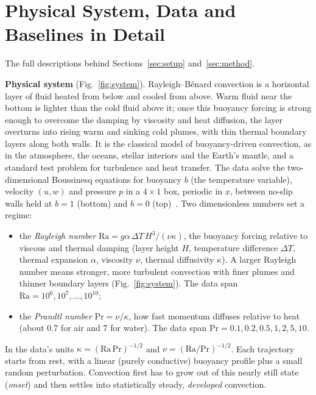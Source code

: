 \documentclass[11pt]{article}
\begin{document}
\FloatBarrier
\section{Physical System, Data and Baselines in Detail}
\label{app:setup}

The full descriptions behind Sections~\ref{sec:setup} and~\ref{sec:method}.

\textbf{Physical system} (Fig.~\ref{fig:system}). Rayleigh--B\'enard convection is a horizontal layer of fluid
heated from below and cooled from above. Warm fluid near the bottom is lighter than the cold fluid above it; once
this buoyancy forcing is strong enough to overcome the damping by viscosity and heat diffusion, the layer overturns
into rising warm and sinking cold plumes, with thin thermal boundary layers along both walls. It is the classical
model of buoyancy-driven convection, as in the atmosphere, the oceans, stellar interiors and the Earth's mantle,
and a standard test problem for turbulence and heat transfer. The data solve the two-dimensional Boussinesq
equations for buoyancy $b$ (the temperature variable), velocity $(u, w)$ and pressure $p$ in a $4\times1$ box,
periodic in $x$, between no-slip walls held at $b=1$ (bottom) and $b=0$ (top)~\cite{wellrb}. Two dimensionless
numbers set a regime:
\begin{itemize}
    \item the \emph{Rayleigh number} $\mathrm{Ra}=g\alpha\,\Delta T\,H^3/(\nu\kappa)$, the buoyancy forcing
    relative to viscous and thermal damping (layer height $H$, temperature difference $\Delta T$, thermal
    expansion $\alpha$, viscosity $\nu$, thermal diffusivity $\kappa$). A larger Rayleigh number means stronger,
    more turbulent convection with finer plumes and thinner boundary layers (Fig.~\ref{fig:system}). The data
    span $\mathrm{Ra}=10^6, 10^7, \dots, 10^{10}$;
    \item the \emph{Prandtl number} $\mathrm{Pr}=\nu/\kappa$, how fast momentum diffuses relative to heat (about
    0.7 for air and 7 for water). The data span $\mathrm{Pr}=0.1, 0.2, 0.5, 1, 2, 5, 10$.
\end{itemize}
In the data's units $\kappa=(\mathrm{Ra}\,\mathrm{Pr})^{-1/2}$ and $\nu=(\mathrm{Ra}/\mathrm{Pr})^{-1/2}$. Each
trajectory starts from rest, with a linear (purely conductive) buoyancy profile plus a small random perturbation.
Convection first has to grow out of this nearly still state (\emph{onset}) and then settles into statistically
steady, \emph{developed} convection.
\end{document}
